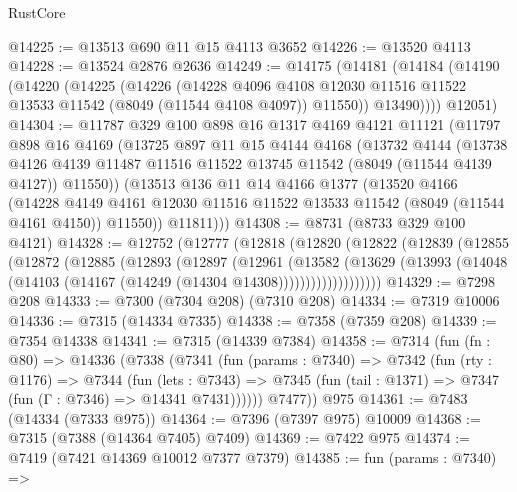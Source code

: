 \begin{lexlean}{RustCore}
\begin{coremodule}
@14225 := @13513 @690 @11 @15 @4113 @3652
@14226 := @13520 @4113
@14228 := @13524 @2876 @2636
@14249 := @14175
    (@14181
      (@14184
        (@14190
          (@14220
            (@14225
              (@14226
                (@14228
                  @4096
                  @4108
                  @12030
                  @11516
                  @11522
                  @13533
                  @11542
                  (@8049 (@11544 @4108 @4097))
                  @11550))
              @13490))))
      @12051)
@14304 := @11787
    @329
    @100
    @898
    @16
    @1317
    @4169
    @4121
    @11121
    (@11797
      @898
      @16
      @4169
      (@13725
        @897
        @11
        @15
        @4144
        @4168
        (@13732
          @4144
          (@13738
            @4126
            @4139
            @11487
            @11516
            @11522
            @13745
            @11542
            (@8049 (@11544 @4139 @4127))
            @11550))
        (@13513
          @136
          @11
          @14
          @4166
          @1377
          (@13520
            @4166
            (@14228
              @4149
              @4161
              @12030
              @11516
              @11522
              @13533
              @11542
              (@8049 (@11544 @4161 @4150))
              @11550))
          @11811)))
@14308 := @8731 (@8733 @329 @100 @4121)
@14328 := @12752
    (@12777
      (@12818
        (@12820
          (@12822
            (@12839
              (@12855
                (@12872
                  (@12885
                    (@12893
                      (@12897
                        (@12961
                          (@13582
                            (@13629
                              (@13993
                                (@14048 (@14103 (@14167 (@14249 (@14304 @14308)))))))))))))))))))
@14329 := @7298 @208
@14333 := @7300 (@7304 @208) (@7310 @208)
@14334 := @7319 @10006
@14336 := @7315 (@14334 @7335)
@14338 := @7358 (@7359 @208)
@14339 := @7354 @14338
@14341 := @7315 (@14339 @7384)
@14358 := @7314
    (fun (fn : @80) =>
    @14336
      (@7338
        (@7341
          (fun (params : @7340) =>
          @7342
            (fun (rty : @1176) =>
            @7344
              (fun (lets : @7343) =>
              @7345 (fun (tail : @1371) => @7347 (fun (Γ : @7346) => @14341 @7431))))))
        @7477))
    @975
@14361 := @7483 (@14334 (@7333 @975))
@14364 := @7396 (@7397 @975) @10009
@14368 := @7315 (@7388 (@14364 @7405) @7409)
@14369 := @7422 @975
@14374 := @7419 (@7421 @14369 @10012 @7377 @7379)
@14385 := fun (params : @7340) =>

\end{coremodule}
\end{lexlean}
